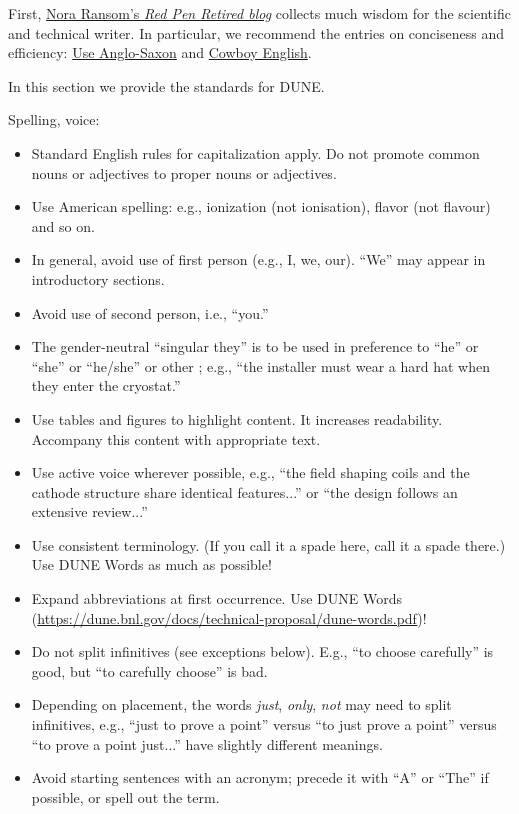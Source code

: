 First, \href{http://redpenretired.blogspot.com/}{Nora Ransom's \textit{Red Pen Retired blog}} collects much wisdom for the scientific and technical writer. In particular, we recommend the entries on conciseness and efficiency: \href{http://redpenretired.blogspot.com/2014/07/use-anglo-saxon.html}{Use Anglo-Saxon} and  \href{http://redpenretired.blogspot.com/2014/07/cowboy-english.html}{Cowboy English}.

In this section we provide the standards for DUNE.

Spelling, voice:
\begin{itemize}
\item Standard English rules for capitalization apply. Do not promote common nouns or adjectives to proper nouns or adjectives.
\item Use American spelling: e.g., ionization (not ionisation), flavor (not flavour) and so on.
\item In general, avoid use of first person (e.g., I, we, our).  ``We'' may appear in introductory sections.
\item Avoid use of second person, i.e., ``you.''
\item The gender-neutral ``singular they'' is to be used in preference to ``he'' or ``she'' or ``he/she'' or other ; e.g., ``the installer must wear a hard hat when they enter the cryostat.''
\item Use tables and figures to highlight content. It increases readability. Accompany this content with appropriate text.
\item Use active voice wherever possible, e.g., ``the field shaping coils and the cathode structure share identical features...'' or ``the design follows  an extensive review...''
\item Use consistent terminology. (If you call it a spade here, call it a spade there.) Use DUNE Words as much as possible!
\item Expand abbreviations at first occurrence. Use DUNE Words (\url{https://dune.bnl.gov/docs/technical-proposal/dune-words.pdf})!
\item Do not split infinitives (see exceptions below). E.g., ``to choose carefully'' is good, but ``to carefully choose'' is bad. 
\item Depending on placement, the words \textit{just}, \textit{only}, \textit{not} may need to split infinitives, e.g., ``just to prove a point'' versus ``to just prove a point'' versus ``to prove a point just...'' have slightly different meanings.
\item Avoid starting sentences with an acronym; precede it with ``A'' or ``The'' if possible, or spell out the term.
\end{itemize}

